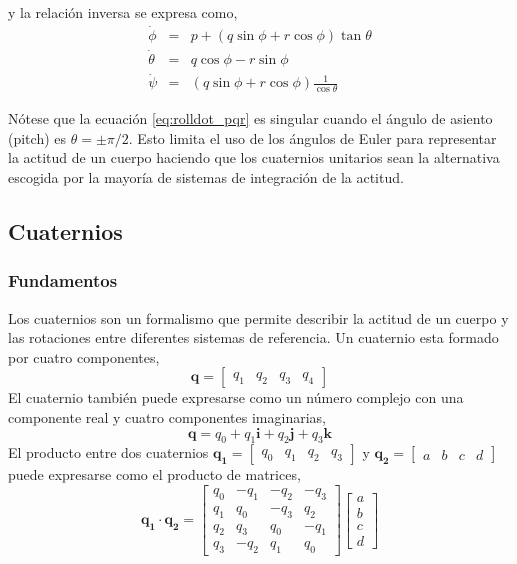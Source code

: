 \documentclass[a4paper,12pt]{book}
\begin{document}
y la relación inversa se expresa como,
\begin{eqnarray}
    \dot{\phi} &=& p + (q\sin\phi + r\cos\phi)\tan\theta\\
    \dot{\theta} & =& q\cos\phi - r\sin\phi\\
    \label{eq:rolldot_pqr}\dot{\psi} & = & (q\sin\phi + r\cos\phi)\frac{1}{\cos\theta}
\end{eqnarray}

Nótese que la ecuación \eqref{eq:rolldot_pqr} es singular cuando el ángulo de asiento (pitch) es $\theta = \pm\pi/2$. Esto limita el uso de los ángulos de Euler para representar la actitud de un cuerpo haciendo que los cuaternios unitarios sean la alternativa escogida por la mayoría de sistemas de integración de la actitud.


\subsection{Cuaternios}
\subsubsection{Fundamentos}

Los cuaternios son un formalismo que permite describir la actitud de un cuerpo y las rotaciones entre diferentes sistemas de referencia. Un cuaternio esta formado por cuatro componentes,
\begin{equation}
    \mathbf{q} = \begin{bmatrix}
        q_1 & q_2 & q_3 &q_4
    \end{bmatrix}
\end{equation}
El cuaternio también puede expresarse como un número complejo con una componente real y cuatro componentes imaginarias,
\begin{equation}
    \mathbf{q} = q_0 + q_1\mathbf{i} + q_2\mathbf{j} + q_3\mathbf{k}
\end{equation}
El producto entre dos cuaternios $\mathbf{q_1} = \begin{bmatrix} q_0 & q_1 & q_2 &q_3\end{bmatrix}$ y $\mathbf{q_2} = \begin{bmatrix} a & b & c &d\end{bmatrix}$ puede expresarse como el producto de matrices,
\begin{equation}
    \mathbf{q_1}\cdot\mathbf{q_2} = \begin{bmatrix}q_0 & -q_1 & -q_2 & -q_3 \\ q_1 & q_0 & -q_3 & q_2 \\ q_2 & q_3 & q_0 & -q_1 \\ q_3 & -q_2 & q_1 & q_0  \end{bmatrix} \begin{bmatrix} a \\ b \\ c\\ d\end{bmatrix}
\end{equation}
\end{document}
